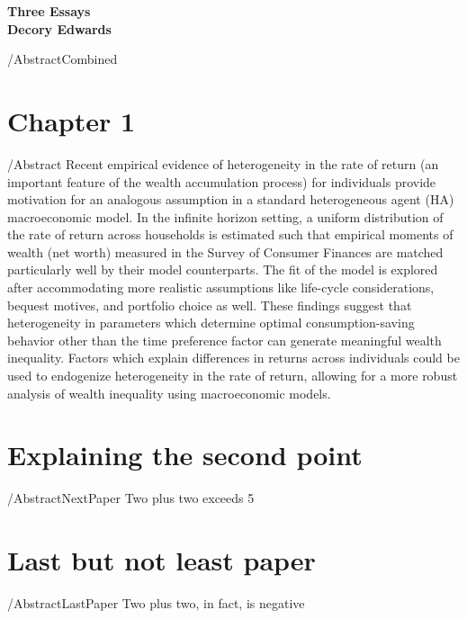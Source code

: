 \documentclass{scrartcl}
\begin{document}
\begin{center}
{\Large \textbf{Three Essays}}
\\[5pt]
{\large \textbf{Decory Edwards}}

\end{center}

\begin{verbatimwrite}{\abstractpath/AbstractCombined\mymoniker}
  
\end{verbatimwrite}


\section{Chapter 1}
\begin{verbatimwrite}{\abstractpath/Abstract\mymoniker}
 Recent empirical evidence of heterogeneity in the rate of return (an important feature of the wealth accumulation process) for individuals provide motivation for an analogous assumption in a standard heterogeneous agent (HA) macroeconomic model. In the infinite horizon setting, a uniform distribution of the rate of return across households is estimated such that empirical moments of wealth (net worth) measured in the Survey of Consumer Finances are matched particularly well by their model counterparts. The fit of the model is explored after accommodating more realistic assumptions like life-cycle considerations, bequest motives, and portfolio choice as well. These findings suggest that heterogeneity in parameters which determine optimal consumption-saving behavior other than the time preference factor can generate meaningful wealth inequality. Factors which explain differences in returns across individuals could be used to endogenize heterogeneity in the rate of return, allowing for a more robust analysis of wealth inequality using macroeconomic models.
\end{verbatimwrite}


\section{Explaining the second point}
\begin{verbatimwrite}{\abstractpath/AbstractNextPaper\mymoniker}
  Two plus two exceeds 5
\end{verbatimwrite}


\section{Last but not least paper}
\begin{verbatimwrite}{\abstractpath/AbstractLastPaper\mymoniker}
  Two plus two, in fact, is negative
\end{verbatimwrite}

\end{document}
